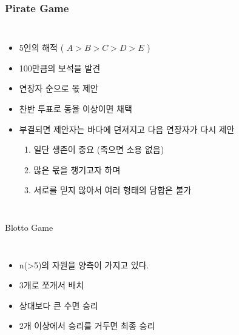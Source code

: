 \documentclass[final]{beamer}
\begin{document}
\begin{frame}\frametitle{Pirate Game}\vspace{0em}
\begin{columns}[c]
\column{19em}
\begin{itemize}
	\item 5인의 해적 ( $A>B>C>D>E$ )
	\item 100만큼의 보석을 발견 
	\item 연장자 순으로 몫 제안
	\item 찬반 투표로 동율 이상이면 채택 
	\item  부결되면 제안자는 바다에 뎐져지고 다음 연장자가 다시 제안
	\begin{enumerate}
		\item 일단 생존이 중요 (죽으면 소용 없음) 
		\item 많은 몫을 챙기고자 하며 
		\item 서로를 믿지 않아서 여러 형태의 담합은 불가 
	\end{enumerate}
\end{itemize}
\column{15em} 
\end{columns}
\end{frame}

\begin{frame}[t]{Blotto Game}
	\begin{columns}[c]
	\column{19em}
	\begin{itemize}
		\item n(>5)의 자원을 양측이 가지고 있다. 
		\item 3개로 쪼개서 배치  
		\item 상대보다 큰 수면 승리 
		\item 2개 이상에서 승리를 거두면 최종 승리 
	\end{itemize}
	\column{15em} 
	\end{columns}
\end{frame}

\end{document}
